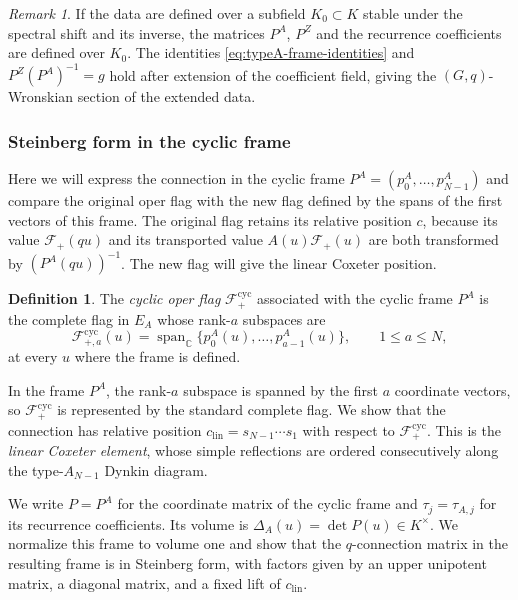 \documentclass[11pt,leqno]{amsart}
\numberwithin{equation}{section}
\theoremstyle{plain}
\theoremstyle{definition}
\newtheorem{definition}[theorem]{Definition}
\theoremstyle{plain}
\theoremstyle{definition}
\theoremstyle{remark}
\newtheorem{remark}[theorem]{Remark}
\begin{document}
\begin{remark}\label{rem:typeA-fixed-data}
If the data are defined over a subfield $K_0\subset K$ stable under the spectral shift and its inverse, the matrices $P^A$, $P^Z$ and the recurrence coefficients are defined over $K_0$. The identities \eqref{eq:typeA-frame-identities} and $P^Z(P^A)^{-1}=g$ hold after extension of the coefficient field, giving the $(G,q)$-Wronskian section of the extended data.
\end{remark}

\subsubsection{Steinberg form in the cyclic frame}\label{sec:typeA-cyclic-algebra}

Here we will express the connection in the cyclic frame $P^A=(p_0^A,\ldots,p_{N-1}^A)$ and compare the original oper flag with the new flag defined by the spans of the first vectors of this frame. The original flag retains its relative position $c$, because its value $\mathcal F_+(qu)$ and its transported value $A(u)\mathcal F_+(u)$ are both transformed by $(P^A(qu))^{-1}$. The new flag will give the linear Coxeter position.

\begin{definition}\label{def:typeA-cyclic-flag}
The \emph{cyclic oper flag} $\mathcal F_+^{\mathrm{cyc}}$ associated with the cyclic frame $P^A$ is the complete flag in $E_A$ whose rank-$a$ subspaces are
\[
 \mathcal F_{+,a}^{\mathrm{cyc}}(u)
 =\operatorname{span}_{\mathbb C}\{p_0^A(u),\ldots,p_{a-1}^A(u)\},
 \qquad 1\le a\le N,
\]
at every $u$ where the frame is defined.
\end{definition}
In the frame $P^A$, the rank-$a$ subspace is spanned by the first $a$ coordinate vectors, so $\mathcal F_+^{\mathrm{cyc}}$ is represented by the standard complete flag.  We show that the connection has relative position $c_{\mathrm{lin}}=s_{N-1}\cdots s_1$ with respect to $\mathcal F_+^{\mathrm{cyc}}$.  This is the \emph{linear Coxeter element}, whose simple reflections are ordered consecutively along the type-$A_{N-1}$ Dynkin diagram.

We write $P=P^A$ for the coordinate matrix of the cyclic frame and $\tau_j=\tau_{A,j}$ for its recurrence coefficients.  Its volume is $\Delta_A(u)=\det P(u)\in K^\times$.  We normalize this frame to volume one and show that the $q$-connection matrix in the resulting frame is in Steinberg form, with factors given by an upper unipotent matrix, a diagonal matrix, and a fixed lift of $c_{\mathrm{lin}}$.
\end{document}
